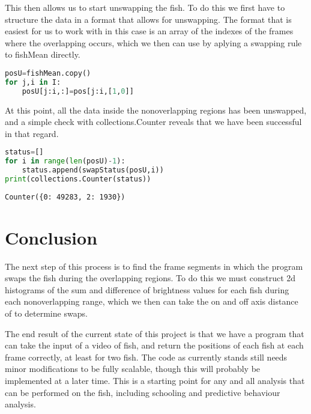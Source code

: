 \documentclass[12pt]{article}
\begin{document}
This then allows us to start unswapping the fish. To do this we first have to structure the data in a format that allows for unswapping. The format that is easiest for us to work with in this case is an array of the indexes of the frames where the overlapping occurs, which we then can use by aplying a swapping rule to fishMean directly.
\begin{lstlisting}[language=Python]
posU=fishMean.copy()
for j,i in I:
    posU[j:i,:]=pos[j:i,[1,0]]
\end{lstlisting}

At this point, all the data inside the nonoverlapping regions has been unswapped, and a simple check with collections.Counter reveals that we have been successful in that regard.
\begin{lstlisting}[language=Python]
status=[]
for i in range(len(posU)-1):
    status.append(swapStatus(posU,i))
print(collections.Counter(status))
\end{lstlisting}
\begin{verbatim}
Counter({0: 49283, 2: 1930})
\end{verbatim}

\section*{Conclusion}

The next step of this process is to find the frame segments in which the program swaps the fish during the overlapping regions. To do this we must construct 2d histograms of the sum and difference of brightness values for each fish during each nonoverlapping range, which we then can take the on and off axis distance of to determine swaps.

The end result of the current state of this project is that we have a program that can take the input of a video of fish, and return the positions of each fish at each frame correctly, at least for two fish. The code as currently stands still needs minor modifications to be fully scalable, though this will probably be implemented at a later time. This is a starting point for any and all analysis that can be performed on the fish, including schooling and predictive behaviour analysis.
\end{document}

